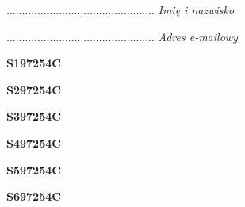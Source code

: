 \begin{turn}{90}\begin{minipage}{\linewidth} \vspace{20mm} ................................................  \textit{Imię i nazwisko}\end{minipage}\end{turn}

\begin{turn}{90}\begin{minipage}{\linewidth} \vspace{20mm} ................................................  \textit{Adres e-mailowy}\end{minipage}\end{turn}

\begin{turn}{90}\huge \begin{minipage}{\linewidth} \vspace{10mm}\textbf{S197254C}\end{minipage}\end{turn}

\begin{turn}{90}\huge \begin{minipage}{\linewidth} \vspace{10mm}\textbf{S297254C}\end{minipage}\end{turn}

\begin{turn}{90}\huge \begin{minipage}{\linewidth} \vspace{10mm}\textbf{S397254C}\end{minipage}\end{turn}

\begin{turn}{90}\huge \begin{minipage}{\linewidth} \vspace{10mm}\textbf{S497254C}\end{minipage}\end{turn}

\begin{turn}{90}\huge \begin{minipage}{\linewidth} \vspace{10mm}\textbf{S597254C}\end{minipage}\end{turn}

\begin{turn}{90}\huge \begin{minipage}{\linewidth} \vspace{10mm}\textbf{S697254C}\end{minipage}\end{turn}

